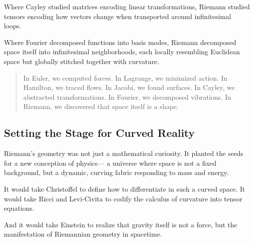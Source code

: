 Where Cayley studied matrices encoding linear transformations,  
Riemann studied tensors encoding how vectors change when transported around infinitesimal loops.

Where Fourier decomposed functions into basis modes,  
Riemann decomposed space itself into infinitesimal neighborhoods,  
each locally resembling Euclidean space but globally stitched together with curvature.

\bigskip

\begin{quote}
In Euler, we computed forces.  
In Lagrange, we minimized action.  
In Hamilton, we traced flows.  
In Jacobi, we found surfaces.  
In Cayley, we abstracted transformations.  
In Fourier, we decomposed vibrations.  
In Riemann, we discovered that space itself is a shape.
\end{quote}

\subsection*{Setting the Stage for Curved Reality}

Riemann’s geometry was not just a mathematical curiosity.  
It planted the seeds for a new conception of physics—  
a universe where space is not a fixed background, but a dynamic, curving fabric responding to mass and energy.

It would take Christoffel to define how to differentiate in such a curved space.  
It would take Ricci and Levi-Civita to codify the calculus of curvature into tensor equations.

And it would take Einstein to realize that gravity itself is not a force,  
but the manifestation of Riemannian geometry in spacetime.

